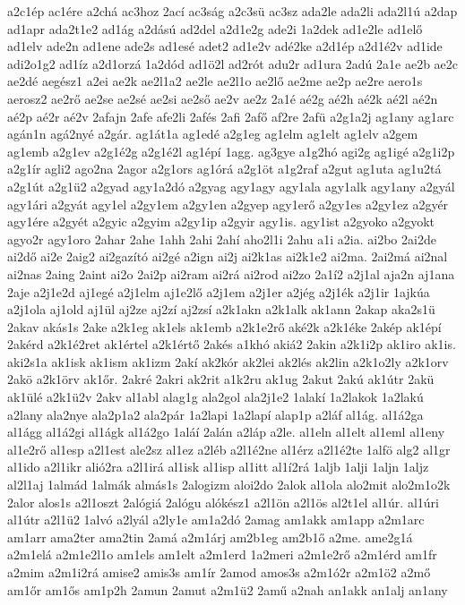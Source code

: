 {a2c1ép
ac1ére
a2chá
ac3hoz
2ací
ac3ság
a2c3sü
ac3sz
ada2le
ada2li
ada2l1ú
a2dap
ad1apr
ada2t1e2
ad1ág
a2dású
ad2del
a2d1e2g
ade2i
1a2dek
ad1e2le
ad1elő
ad1elv
ade2n
ad1ene
ade2s
ad1esé
adet2
ad1e2v
adé2ke
a2d1ép
a2d1é2v
ad1ide
adi2o1g2
ad1íz
a2d1orzá
1a2dód
ad1ö2l
ad2rót
adu2r
ad1ura
2adú
2a1e
ae2b
ae2c
ae2dé
aegész1
a2ei
ae2k
ae2l1a2
ae2le
ae2l1o
ae2lő
ae2me
ae2p
ae2re
aero1s
aerosz2
ae2rő
ae2se
ae2sé
ae2si
ae2ső
ae2v
ae2z
2a1é
aé2g
aé2h
aé2k
aé2l
aé2n
aé2p
aé2r
aé2v
2afajn
2afe
afe2li
2afés
2afi
2afő
af2re
2afü
a2g1a2j
ag1any
ag1arc
agán1n
agá2nyé
a2gár.
ag1át1a
ag1edé
a2g1eg
ag1elm
ag1elt
ag1elv
a2gem
ag1emb
a2g1ev
a2g1é2g
a2g1é2l
ag1épí
1agg.
ag3gye
a1g2hó
agi2g
ag1igé
a2g1i2p
a2g1ír
agli2
ago2na
2agor
a2g1ors
ag1órá
a2g1öt
a1g2raf
a2gut
ag1uta
ag1u2tá
a2g1út
a2g1ü2
a2gyad
agy1a2dó
a2gyag
agy1agy
agy1ala
agy1alk
agy1any
a2gyál
agy1ári
a2gyát
agy1el
a2gy1em
a2gy1en
a2gyep
agy1erő
a2gy1es
a2gy1ez
a2gyér
agy1ére
a2gyét
a2gyic
a2gyim
a2gy1ip
a2gyir
agy1is.
agy1ist
a2gyoko
a2gyokt
agyo2r
agy1oro
2ahar
2ahe
1ahh
2ahi
2ahí
aho2l1i
2ahu
a1i
a2ia.
ai2bo
2ai2de
ai2dő
ai2e
2aig2
ai2gazító
ai2gé
a2ign
ai2j
ai2k1as
ai2k1e2
ai2ma.
2ai2má
ai2nal
ai2nas
2aing
2aint
ai2o
2ai2p
ai2ram
ai2rá
ai2rod
ai2zo
2a1í2
a2j1al
aja2n
aj1ana
2aje
a2j1e2d
aj1egé
a2j1elm
aj1e2lő
a2j1em
a2j1er
a2jég
a2j1ék
a2j1ir
1ajkúa
a2j1ola
aj1old
aj1ül
aj2ze
aj2zí
aj2zsí
a2k1akn
a2k1alk
ak1ann
2akap
aka2s1ü
2akav
akás1s
2ake
a2k1eg
ak1els
ak1emb
a2k1e2rő
aké2k
a2k1éke
2akép
ak1épí
2akérd
a2k1é2ret
ak1értel
a2k1értő
2akés
a1khó
akiá2
2akin
a2k1i2p
ak1iro
ak1is.
aki2s1a
ak1isk
ak1ism
ak1izm
2akí
ak2kór
ak2lei
ak2lés
ak2lin
a2k1o2ly
a2k1orv
2akö
a2k1örv
ak1őr.
2akré
2akri
ak2rit
a1k2ru
ak1ug
2akut
2akú
ak1útr
2akü
ak1ülé
a2k1ü2v
2akv
al1abl
alag1g
ala2gol
ala2j1e2
1alakí
1a2lakok
1a2lakú
a2lany
ala2nye
ala2p1a2
ala2pár
1a2lapi
1a2lapí
alap1p
a2láf
al1ág.
al1á2ga
al1ágg
al1á2gi
al1ágk
al1á2go
1aláí
2alán
a2láp
a2le.
al1eln
al1elt
al1eml
al1eny
al1e2rő
al1esp
a2l1est
ale2sz
al1ez
a2léb
a2l1é2ne
al1érz
a2l1é2te
1alfö
alg2
al1gr
al1ido
a2l1ikr
alió2ra
a2l1irá
al1isk
al1isp
al1itt
al1í2rá
1aljb
1alji
1aljn
1aljz
al2l1aj
1almád
1almák
almás1s
2alogizm
aloi2do
2alok
al1ola
alo2mit
alo2m1o2k
2alor
alos1s
a2l1oszt
2alógiá
2alógu
alókész1
a2l1ön
a2l1ös
al2t1el
al1úr.
al1úri
al1útr
a2l1ü2
1alvó
a2lyál
a2ly1e
am1a2dó
2amag
am1akk
am1app
a2m1arc
am1arr
ama2ter
ama2tin
2amá
a2m1árj
am2b1eg
am2b1ő
a2me.
ame2g1á
a2m1elá
a2m1e2l1o
am1els
am1elt
a2m1erd
1a2meri
a2m1e2rő
a2m1érd
am1fr
a2mim
a2m1i2rá
amise2
amis3s
am1ír
2amod
amos3s
a2m1ó2r
a2m1ö2
a2mő
am1őr
am1ős
am1p2h
2amun
2amut
a2m1ü2
2amű
a2nah
an1akk
an1alj
an1any
}
